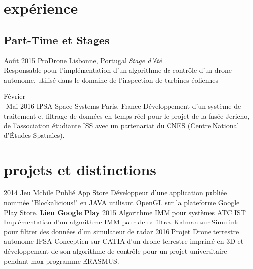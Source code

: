 \documentclass[]{friggeri-cv} %
\begin{document}

\section{expérience}


\subsection{Part-Time et Stages}

\begin{entrylist}

\entry
{Août 2015}
{ProDrone}
{Lisbonne, Portugal}
{\emph{Stage d'été} \\
Responsable pour l'implémentation d'un algorithme de contrôle d'un drone autonome, utilisé dans le domaine de l'inspection de turbines éoliennes}



\entry
{Février\\-Mai 2016}
{IPSA Space Systems}
{Paris, France}
{Développement d'un système de traitement et filtrage de données en temps-réel pour le projet de la fusée Jericho, de l'association étudiante ISS avec un partenariat du CNES (Centre National d'Études Spatiales).}




\end{entrylist}


\section{projets et distinctions}

\begin{entrylist}


\entry
{2014}
{Jeu Mobile Publié}
{App Store}
{Développeur d'une application publiée nommée "Blockalicious!" en JAVA utilisant OpenGL sur la plateforme Google Play Store.
\href{https://play.google.com/store/apps/details?id=com.guiero.blockaliciousfinal}{\textbf{Lien Google Play}}}
\entry
{2015}
{Algorithme IMM pour systèmes ATC}
{IST}
{Implémentation d'un algorithme IMM pour deux filtres Kalman sur Simulink pour filtrer des données d'un simulateur de radar}
\entry
{2016}
{Projet Drone terrestre autonome}
{IPSA}
{Conception sur CATIA d'un drone terrestre imprimé en 3D et développement de son algorithme de contrôle pour un projet universitaire pendant mon programme ERASMUS.}
\end{entrylist}
\end{document}
